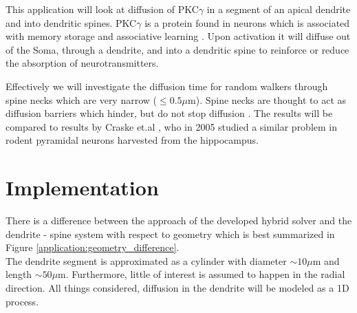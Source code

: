 \noindent This application will look at diffusion of PKC$\gamma$ in a segment of an apical dendrite and into dendritic spines. 
PKC$\gamma$ is a protein found in neurons which is associated with memory storage and associative learning \cite{saito2002protein}. 
Upon activation it will diffuse out of the Soma, through a dendrite, and into a dendritic spine to reinforce or reduce the absorption of neurotransmitters. 

Effectively we will investigate the diffusion time for random walkers through spine necks which are very narrow ($\leq0.5\mu$m). Spine necks are thought to act as diffusion barriers which hinder, but do not stop diffusion \cite{craske2005spines}.
The results will be compared to results by Craske et.al \cite{craske2005spines}, who in 2005 studied a similar problem in rodent pyramidal neurons harvested from the hippocampus.

\section{Implementation}

There is a difference between the approach of the developed hybrid solver and the dendrite - spine system with respect to geometry which is best summarized in Figure \ref{application:geometry_difference}.\\

\noindent The dendrite segment is approximated as a cylinder with diameter $\sim10\mu$m and length $\sim50\mu$m. Furthermore, little of interest is assumed to happen in the radial direction. All things considered, diffusion in the dendrite will be modeled as a 1D process. \\

